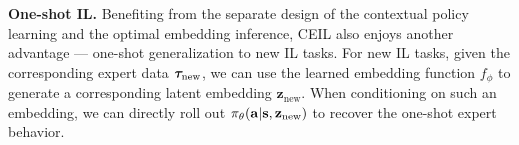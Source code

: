 \textbf{One-shot IL.} Benefiting from the separate design of  the contextual policy learning and the optimal embedding inference, CEIL also enjoys another advantage --- one-shot generalization to new IL tasks. 
For new IL tasks, given the corresponding expert data ${{\bm{\tau}}}_\text{new}$, we can use the learned embedding function $f_\phi$ to generate a corresponding latent embedding ${\mathbf{{z}}}_\text{new}$. When conditioning on such an embedding, we can directly roll out $\pi_\theta(\mathbf{a}|\mathbf{s}, {\mathbf{{z}}}_\text{new})$ to recover the one-shot expert behavior. 





